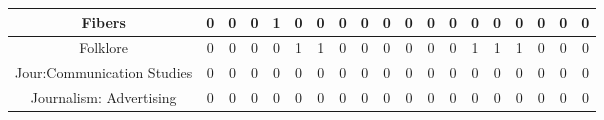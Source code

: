 \documentclass[10]{article}
\begin{document}
\begin{landscape}
\begin{longtable}[c]{|ccccccccccccccccccc|}
	\multicolumn{1}{|c|}{Fibers}                                     & \multicolumn{1}{c|}{0}          & \multicolumn{1}{c|}{0}          & \multicolumn{1}{c|}{0}          & \multicolumn{1}{c|}{1}          & \multicolumn{1}{c|}{0}          & \multicolumn{1}{c|}{0}          & \multicolumn{1}{c|}{0}          & \multicolumn{1}{c|}{0}          & \multicolumn{1}{c|}{0}          & \multicolumn{1}{c|}{0}          & \multicolumn{1}{c|}{0}          & \multicolumn{1}{c|}{0}          & \multicolumn{1}{c|}{0}          & \multicolumn{1}{c|}{0}          & \multicolumn{1}{c|}{0}          & \multicolumn{1}{c|}{0}          & \multicolumn{1}{c|}{0}          & 0          \\ \hline
	\multicolumn{1}{|c|}{Folklore}                                   & \multicolumn{1}{c|}{0}          & \multicolumn{1}{c|}{0}          & \multicolumn{1}{c|}{0}          & \multicolumn{1}{c|}{0}          & \multicolumn{1}{c|}{1}          & \multicolumn{1}{c|}{1}          & \multicolumn{1}{c|}{0}          & \multicolumn{1}{c|}{0}          & \multicolumn{1}{c|}{0}          & \multicolumn{1}{c|}{0}          & \multicolumn{1}{c|}{0}          & \multicolumn{1}{c|}{0}          & \multicolumn{1}{c|}{1}          & \multicolumn{1}{c|}{1}          & \multicolumn{1}{c|}{1}          & \multicolumn{1}{c|}{0}          & \multicolumn{1}{c|}{0}          & 0          \\ \hline
	\multicolumn{1}{|c|}{Jour:Communication Studies}                 & \multicolumn{1}{c|}{0}          & \multicolumn{1}{c|}{0}          & \multicolumn{1}{c|}{0}          & \multicolumn{1}{c|}{0}          & \multicolumn{1}{c|}{0}          & \multicolumn{1}{c|}{0}          & \multicolumn{1}{c|}{0}          & \multicolumn{1}{c|}{0}          & \multicolumn{1}{c|}{0}          & \multicolumn{1}{c|}{0}          & \multicolumn{1}{c|}{0}          & \multicolumn{1}{c|}{0}          & \multicolumn{1}{c|}{0}          & \multicolumn{1}{c|}{0}          & \multicolumn{1}{c|}{0}          & \multicolumn{1}{c|}{0}          & \multicolumn{1}{c|}{0}          & 0          \\ \hline
	\multicolumn{1}{|c|}{Journalism: Advertising}                    & \multicolumn{1}{c|}{0}          & \multicolumn{1}{c|}{0}          & \multicolumn{1}{c|}{0}          & \multicolumn{1}{c|}{0}          & \multicolumn{1}{c|}{0}          & \multicolumn{1}{c|}{0}          & \multicolumn{1}{c|}{0}          & \multicolumn{1}{c|}{0}          & \multicolumn{1}{c|}{0}          & \multicolumn{1}{c|}{0}          & \multicolumn{1}{c|}{0}          & \multicolumn{1}{c|}{0}          & \multicolumn{1}{c|}{0}          & \multicolumn{1}{c|}{0}          & \multicolumn{1}{c|}{0}          & \multicolumn{1}{c|}{0}          & \multicolumn{1}{c|}{0}          & 0          \\ \hline

\end{longtable}
\end{landscape}
\end{document}
